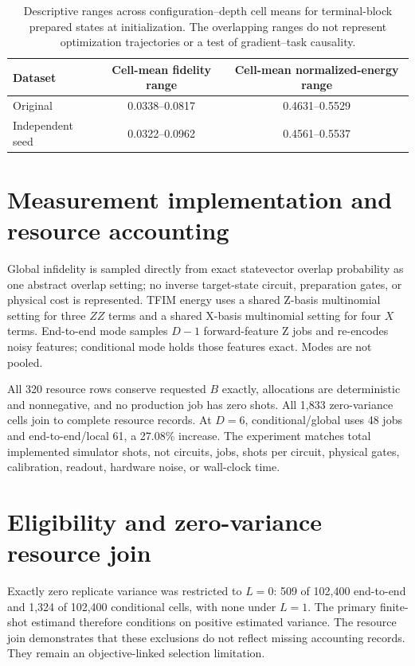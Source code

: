\documentclass[pdflatex,sn-basic,Numbered]{sn-jnl}
\begin{document}
\begin{table}[t]
\centering
\small
\begin{tabular}{lcc}
\toprule
Dataset & Cell-mean fidelity range & Cell-mean normalized-energy range \\
\midrule
Original & 0.0338--0.0817 & 0.4631--0.5529 \\
Independent seed & 0.0322--0.0962 & 0.4561--0.5537 \\
\bottomrule
\end{tabular}
\caption{Descriptive ranges across configuration--depth cell means for terminal-block prepared states at initialization. The overlapping ranges do not represent optimization trajectories or a test of gradient--task causality.}
\label{supp:tab:prepared-state-ranges}
\end{table}

\section{Measurement implementation and resource accounting}

Global infidelity is sampled directly from exact statevector overlap probability as one abstract overlap setting; no inverse target-state circuit, preparation gates, or physical cost is represented. TFIM energy uses a shared Z-basis multinomial setting for three $ZZ$ terms and a shared X-basis multinomial setting for four $X$ terms. End-to-end mode samples $D-1$ forward-feature Z jobs and re-encodes noisy features; conditional mode holds those features exact. Modes are not pooled.

All 320 resource rows conserve requested $B$ exactly, allocations are deterministic and nonnegative, and no production job has zero shots. All 1,833 zero-variance cells join to complete resource records. At $D=6$, conditional/global uses 48 jobs and end-to-end/local 61, a 27.08\% increase. The experiment matches total implemented simulator shots, not circuits, jobs, shots per circuit, physical gates, calibration, readout, hardware noise, or wall-clock time.

\section{Eligibility and zero-variance resource join}

Exactly zero replicate variance was restricted to $L=0$: 509 of 102,400 end-to-end and 1,324 of 102,400 conditional cells, with none under $L=1$. The primary finite-shot estimand therefore conditions on positive estimated variance. The resource join demonstrates that these exclusions do not reflect missing accounting records. They remain an objective-linked selection limitation.
\end{document}
